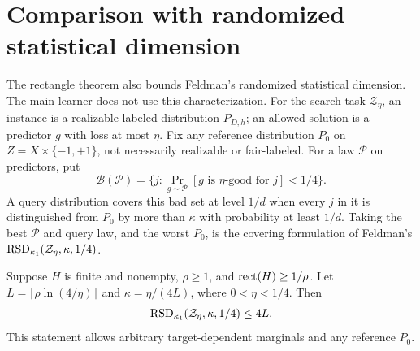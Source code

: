 \section{Comparison with randomized statistical dimension}\label{sec:rsd}
The rectangle theorem also bounds Feldman's randomized statistical dimension. The main learner does not use this characterization.
For the search task $\mathcal Z_\eta$, an instance is a realizable labeled distribution $P_{D,h}$; an allowed solution is a predictor $g$ with loss at most $\eta$. Fix any reference distribution $P_0$ on $Z=X\times\{-1,+1\}$, not necessarily realizable or fair-labeled. For a law $\mathcal P$ on predictors, put
\[
 \mathcal B(\mathcal P)=\{j:\Pr_{g\sim\mathcal P}[g\text{ is }\eta\text{-good for }j]<1/4\}.
\]
A query distribution covers this bad set at level $1/d$ when every $j$ in it is distinguished from $P_0$ by more than $\kappa$ with probability at least $1/d$. Taking the best $\mathcal P$ and query law, and the worst $P_0$, is the covering formulation of Feldman's $\operatorname{RSD}_{\kappa_1}(\mathcal Z_\eta,\kappa,1/4)$.


\begin{theorem}\label{thm:rsd}
Suppose $H$ is finite and nonempty, $\rho\ge1$, and $\operatorname{rect}(H)\ge1/\rho$. Let $L=\lceil\rho\ln(4/\eta)\rceil$ and $\kappa=\eta/(4L)$, where $0<\eta<1/4$. Then
\[
 \operatorname{RSD}_{\kappa_1}(\mathcal Z_\eta,\kappa,1/4)\le4L.
\]
This statement allows arbitrary target-dependent marginals and any reference $P_0$.
\end{theorem}

